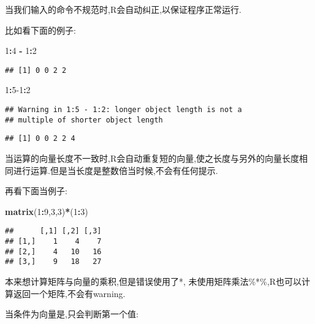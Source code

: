 \documentclass[]{ctexbook}
\newenvironment{Shaded}{\begin{snugshade}}{\end{snugshade}}
\newcommand{\DecValTok}[1]{\textcolor[rgb]{0.00,0.00,0.81}{#1}}
\newcommand{\KeywordTok}[1]{\textcolor[rgb]{0.13,0.29,0.53}{\textbf{#1}}}
\newcommand{\NormalTok}[1]{#1}
\newcommand{\OperatorTok}[1]{\textcolor[rgb]{0.81,0.36,0.00}{\textbf{#1}}}
\newcommand{\StringTok}[1]{\textcolor[rgb]{0.31,0.60,0.02}{#1}}
\begin{document}
当我们输入的命令不规范时,R会自动纠正,以保证程序正常运行.

比如看下面的例子:

\begin{Shaded}
\begin{Highlighting}[]
\DecValTok{1}\OperatorTok{:}\DecValTok{4} \OperatorTok{-}\StringTok{ }\DecValTok{1}\OperatorTok{:}\DecValTok{2}
\end{Highlighting}
\end{Shaded}

\begin{verbatim}
## [1] 0 0 2 2
\end{verbatim}

\begin{Shaded}
\begin{Highlighting}[]
\DecValTok{1}\OperatorTok{:}\DecValTok{5-1}\OperatorTok{:}\DecValTok{2}
\end{Highlighting}
\end{Shaded}

\begin{verbatim}
## Warning in 1:5 - 1:2: longer object length is not a
## multiple of shorter object length
\end{verbatim}

\begin{verbatim}
## [1] 0 0 2 2 4
\end{verbatim}

当运算的向量长度不一致时,R会自动重复短的向量,使之长度与另外的向量长度相同进行运算.但是当长度是整数倍当时候,不会有任何提示.

再看下面当例子:

\begin{Shaded}
\begin{Highlighting}[]
\KeywordTok{matrix}\NormalTok{(}\DecValTok{1}\OperatorTok{:}\DecValTok{9}\NormalTok{,}\DecValTok{3}\NormalTok{,}\DecValTok{3}\NormalTok{)}\OperatorTok{*}\NormalTok{(}\DecValTok{1}\OperatorTok{:}\DecValTok{3}\NormalTok{)}
\end{Highlighting}
\end{Shaded}

\begin{verbatim}
##      [,1] [,2] [,3]
## [1,]    1    4    7
## [2,]    4   10   16
## [3,]    9   18   27
\end{verbatim}

本来想计算矩阵与向量的乘积,但是错误使用了*,
未使用矩阵乘法\%*\%,R也可以计算返回一个矩阵,不会有warning.

当条件为向量是,只会判断第一个值:
\end{document}
